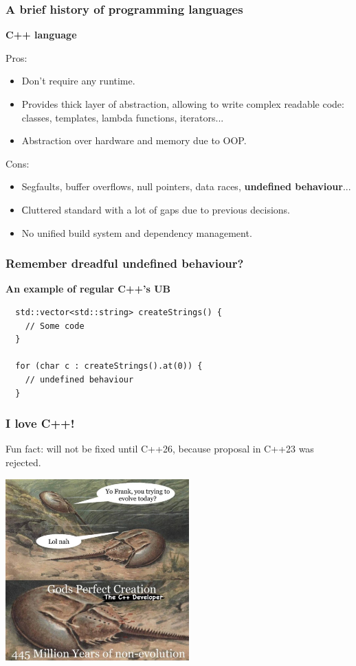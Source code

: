\documentclass[aspectratio=1610,t]{beamer}
\begin{document}

\begin{frame}
\frametitle{A brief history of programming languages}
\textbf{C++ language}

Pros:
\begin{itemize}
    \item Don't require any runtime.
    \item Provides thick layer of abstraction, allowing to write complex readable code: classes, templates, lambda functions, iterators...
    \item Abstraction over hardware and memory due to OOP.
\end{itemize}

Cons:
\begin{itemize}
    \item Segfaults, buffer overflows, null pointers, data races, \textbf{undefined behaviour}...
    \item Сluttered standard with a lot of gaps due to previous decisions.
    \item No unified build system and dependency management.
\end{itemize}
\end{frame}


\begin{frame}[fragile]
\frametitle{Remember dreadful undefined behaviour?}
\textbf{An example of regular C++'s UB}

\begin{verbatim}
  std::vector<std::string> createStrings() {
    // Some code
  }

  for (char c : createStrings().at(0)) {
    // undefined behaviour
  }
\end{verbatim}
\end{frame}


\begin{frame}[fragile]
\frametitle{I love C++!}
Fun fact: will not be fixed until C++26, because proposal in C++23 was rejected.

\begin{center}
    \includegraphics[width=\textwidth,height=7cm,keepaspectratio]{images/cpp-meme.jpg}
\end{center}
\end{frame}
\end{document}
